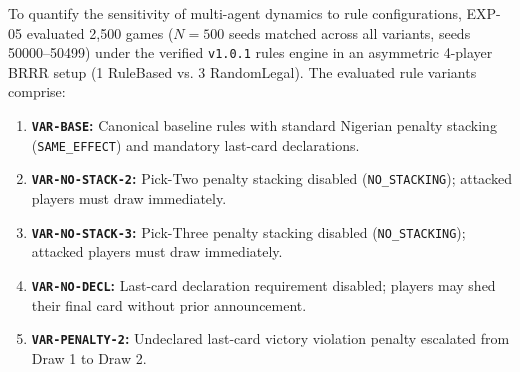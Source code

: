 \documentclass[journal]{IEEEtran}
\begin{document}
To quantify the sensitivity of multi-agent dynamics to rule configurations, EXP-05 evaluated 2,500 games ($N=500$ seeds matched across all variants, seeds 50000--50499) under the verified \texttt{v1.0.1} rules engine in an asymmetric 4-player BRRR setup (1 RuleBased vs. 3 RandomLegal). The evaluated rule variants comprise:
\begin{enumerate}
\item \textbf{\texttt{VAR-BASE}:} Canonical baseline rules with standard Nigerian penalty stacking (\texttt{SAME\_EFFECT}) and mandatory last-card declarations.
\item \textbf{\texttt{VAR-NO-STACK-2}:} Pick-Two penalty stacking disabled (\texttt{NO\_STACKING}); attacked players must draw immediately.
\item \textbf{\texttt{VAR-NO-STACK-3}:} Pick-Three penalty stacking disabled (\texttt{NO\_STACKING}); attacked players must draw immediately.
\item \textbf{\texttt{VAR-NO-DECL}:} Last-card declaration requirement disabled; players may shed their final card without prior announcement.
\item \textbf{\texttt{VAR-PENALTY-2}:} Undeclared last-card victory violation penalty escalated from Draw 1 to Draw 2.
\end{enumerate}

\begin{table}[t]
\centering
\caption{Controlled Rule Variant Ablations on Simulator v1.0.1 (EXP-05, $N = 2{,}500$ Episodes, 500 Seeds per Variant)}
\label{tab:supp_exp05_rule_variants}
\small
{}
\end{table}
\end{document}
